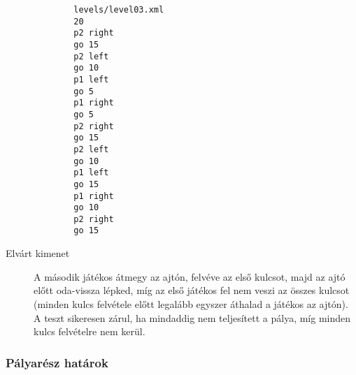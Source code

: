 \begin{description}
\begin{verbatim}
		levels/level03.xml
		20
		p2 right
		go 15
		p2 left
		go 10
		p1 left
		go 5
		p1 right
		go 5
		p2 right
		go 15
		p2 left
		go 10
		p1 left
		go 15
		p1 right
		go 10
		p2 right
		go 15
	\end{verbatim}
	
	\item[Elvárt kimenet] A második játékos átmegy az ajtón, felvéve az első kulcsot, majd az ajtó előtt oda-vissza lépked, míg az első játékos fel nem veszi az összes kulcsot (minden kulcs felvétele előtt legalább egyszer áthalad a játékos az ajtón). A teszt sikeresen zárul, ha mindaddig nem teljesített a pálya, míg minden kulcs felvételre nem kerül.
	
	\end{description}
\newpage

\subsubsection{Pályarész határok}
